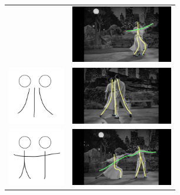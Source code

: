 \begin{table}[h!]
\begin{tabular}{ll}
\begin{minipage}{.28\textwidth}
    \end{minipage} &  
    \begin{minipage}{.28\textwidth}
      \includegraphics[width=\linewidth, height=25mm]{img/keyframe_case_5_(3)}
    \end{minipage}\\
	\begin{minipage}{.28\textwidth}
      \includegraphics[width=\linewidth, height=25mm]{img/06keyframe}
    \end{minipage} & 
    \begin{minipage}{.28\textwidth}
      \includegraphics[width=\linewidth, height=25mm]{img/keyframe_case_6_(3)}
    \end{minipage} \\
	\begin{minipage}{.28\textwidth}
      \includegraphics[width=\linewidth, height=25mm]{img/07keyframe}
    \end{minipage} &  
    \begin{minipage}{.28\textwidth}
      \includegraphics[width=\linewidth, height=25mm]{img/keyframe_case_7_(4)}

\end{minipage}
\end{tabular}
\end{table}
